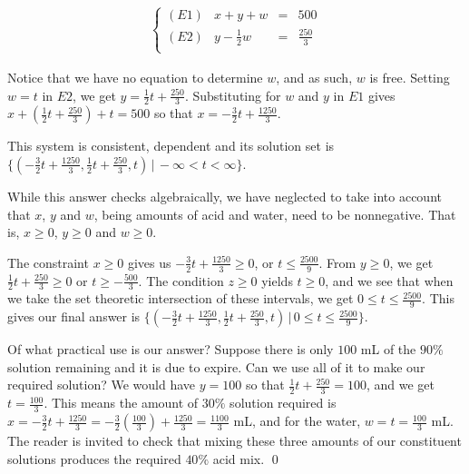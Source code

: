 \documentclass{ximera}
\begin{document}
\begin{example}
\[\begin{array}{ccc}
\left\{ 

\begin{array}{lrcr}

(E1) & x+y+w & = & 500 \\  
(E2) &  y - \frac{1}{2}w & = & \frac{250}{3} \\    

\end{array} 

\right.
\end{array}\]

Notice that we have no equation to determine $w$, and as such, $w$ is free.  Setting $w = t$ in $E2$, we get $y = \frac{1}{2} t + \frac{250}{3}$.  Substituting for $w$ and $y$ in $E1$ gives $x + \left(\frac{1}{2} t + \frac{250}{3}\right) + t = 500$ so that $x = -\frac{3}{2} t + \frac{1250}{3}$.  

This system is consistent, dependent and its solution set is $\{ \left(-\frac{3}{2} t + \frac{1250}{3}, \frac{1}{2} t + \frac{250}{3}, t\right) \, | \, - \infty < t < \infty\}$.  

While this answer checks algebraically, we have neglected to take into account that $x$, $y$ and $w$, being amounts of acid and water, need to be nonnegative.  That is, $x \geq 0$, $y \geq 0$ and $w \geq 0$.  

The constraint $x \geq 0$ gives us  $-\frac{3}{2} t + \frac{1250}{3} \geq 0$, or $t \leq \frac{2500}{9}$. From $y \geq 0$, we get $\frac{1}{2} t + \frac{250}{3} \geq 0$ or $t \geq -\frac{500}{3}$.  The condition $z \geq 0$ yields $t \geq 0$, and we see that when we take the set theoretic intersection of these intervals, we get $0 \leq t \leq \frac{2500}{9}$.  This gives our final answer is $\{ \left(-\frac{3}{2} t + \frac{1250}{3}, \frac{1}{2} t + \frac{250}{3}, t\right) \, | \,0 \leq t \leq \frac{2500}{9} \}$.  

Of what practical use is our answer?  Suppose there is only $100$ mL of the $90 \%$ solution remaining and it is due to expire.  Can we use all of it to make our required solution?  We would have $y = 100$ so that $\frac{1}{2} t + \frac{250}{3} = 100$, and we get $t = \frac{100}{3}$.  This means the amount of $30 \%$ solution required is $x = -\frac{3}{2} t + \frac{1250}{3} =  -\frac{3}{2} \left(\frac{100}{3}\right) + \frac{1250}{3} = \frac{1100}{3}$ mL, and for the water, $w = t = \frac{100}{3}$ mL.  The reader is invited to check that mixing these three amounts of our constituent solutions produces the required $40 \%$ acid mix.  \qed

\end{example}



\closegraphsfile
\end{document}
